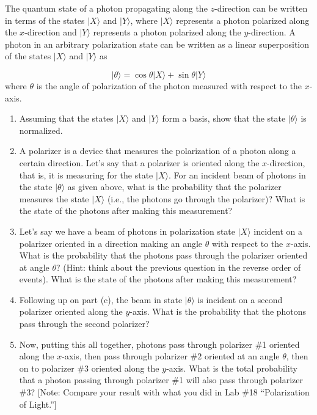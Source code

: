 \begin{problem}

The quantum state of a photon propagating along the $z$-direction
can be written in terms of the states $\vert\mbox{$X$}\rangle$ and
$\vert\mbox{$Y$}\rangle$, where $\vert\mbox{$X$}\rangle$ represents a
photon polarized along the $x$-direction and $\vert\mbox{$Y$}\rangle$
represents a photon polarized along the $y$-direction. A photon in an
arbitrary polarization state can be written as a linear superposition
of the states $\vert\mbox{$X$}\rangle$ and $\vert\mbox{$Y$}\rangle$ as

\[\vert\theta\rangle = \cos{\theta} \vert\mbox{$X$}\rangle + \sin{\theta} \vert\mbox{$Y$}\rangle \]
where $\theta$ is the angle of polarization of the photon measured with 
respect to the $x$-axis.
\begin{enumerate}

\item Assuming that the states $\vert\mbox{$X$}\rangle$ and
$\vert\mbox{$Y$}\rangle$ form a basis, show that the state
$\vert\theta\rangle$ is normalized.

\item A polarizer is a device that measures the polarization of
a photon along a certain direction.  Let's say that a polarizer is
oriented along the $x$-direction, that is, it is measuring for the state
$\vert\mbox{$X$}\rangle$. For an incident beam of photons in the state
$\vert\mbox{$\theta$}\rangle$ as given above, what is the probability
that the polarizer measures the state $\vert\mbox{$X$}\rangle$ (i.e.,
the photons go through the polarizer)?  What is the state of the photons
after making this measurement?

\item Let's say we have a beam of photons in polarization state
$\vert\mbox{$X$}\rangle$ incident on a polarizer oriented in a direction
making an angle $\theta$ with respect to the $x$-axis.  What is the
probability that the photons pass through the polarizer oriented at angle
$\theta$? (Hint: think about the previous question in the reverse order of
events).  What is the state of the photons after making this measurement?

\item Following up on part (c), the beam in state
$\vert\mbox{$\theta$}\rangle$ is incident on a second polarizer oriented
along the $y$-axis.  What is the probability that the photons pass
through the second polarizer?

\item Now, putting this all together, photons pass through polarizer \#1
oriented along the $x$-axis, then pass through polarizer \#2 oriented at
an angle $\theta$, then on to polarizer \#3 oriented along the $y$-axis.
What is the total probability that a photon passing through polarizer
\#1 will also pass through polarizer \#3? [Note: Compare your result
with what you did in Lab \#18 ``Polarization of Light.'']

\end{enumerate}
\label{prob:PhotonProbs}
\end{problem}

